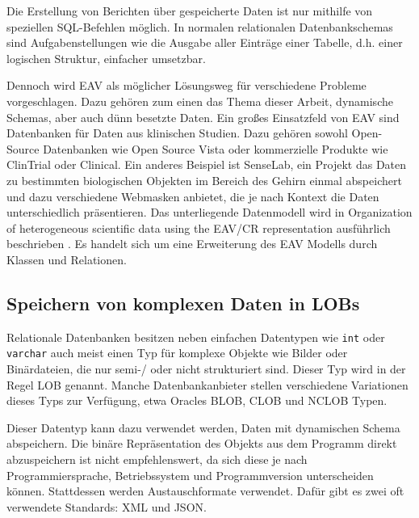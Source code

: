 Die Erstellung von Berichten über gespeicherte Daten ist nur mithilfe von speziellen SQL-Befehlen möglich. In normalen relationalen Datenbankschemas sind Aufgabenstellungen wie die Ausgabe aller Einträge einer Tabelle, d.h. einer logischen Struktur, einfacher umsetzbar.

Dennoch wird EAV als möglicher Lösungsweg für verschiedene Probleme vorgeschlagen. Dazu gehören zum einen das Thema dieser Arbeit, dynamische Schemas, aber auch dünn besetzte Daten. Ein großes Einsatzfeld von EAV sind Datenbanken für Daten aus klinischen Studien. Dazu gehören sowohl Open-Source Datenbanken wie Open Source Vista oder kommerzielle Produkte wie ClinTrial oder Clinical. Ein anderes Beispiel ist SenseLab, ein Projekt das Daten zu bestimmten biologischen Objekten im Bereich des Gehirn einmal abspeichert und dazu verschiedene Webmasken anbietet, die je nach Kontext die Daten unterschiedlich präsentieren. Das unterliegende Datenmodell wird in Organization of heterogeneous scientific data using the EAV/CR representation ausführlich beschrieben \cite{Nadkarni.1999}. Es handelt sich um eine Erweiterung des EAV Modells durch Klassen und Relationen.


\subsection{Speichern von komplexen Daten in LOBs}

Relationale Datenbanken besitzen neben einfachen Datentypen wie \lstinline|int| oder \lstinline|varchar| auch meist einen Typ für komplexe Objekte wie Bilder oder Binärdateien, die nur semi-/ oder nicht strukturiert sind. Dieser Typ wird in der Regel \ac{LOB} genannt. Manche Datenbankanbieter stellen verschiedene Variationen dieses Typs zur Verfügung, etwa Oracles \ac{BLOB}, \ac{CLOB} und \ac{NCLOB} Typen.

Dieser Datentyp kann dazu verwendet werden, Daten mit dynamischen Schema abspeichern. Die binäre Repräsentation des Objekts aus dem Programm direkt abzuspeichern ist nicht empfehlenswert, da sich diese je nach Programmiersprache, Betriebssystem und Programmversion unterscheiden können. Stattdessen werden Austauschformate verwendet. Dafür gibt es zwei oft verwendete Standards: \ac{XML} und \ac{JSON}.

